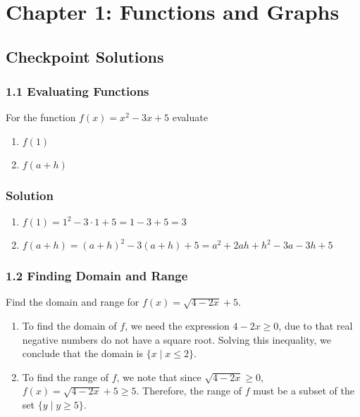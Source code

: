 \documentclass{article}
\begin{document}
\section*{Chapter 1: Functions and Graphs}

\subsection*{Checkpoint Solutions}

\subsubsection*{1.1 Evaluating Functions}

For the function $ f(x) = x^2 - 3x + 5 $ evaluate

\begin{enumerate}[label=(\alph*)]
  \item $ f(1) $
  \item $ f(a + h) $
\end{enumerate}

\subsubsection*{Solution}

\begin{enumerate}[label=(\alph*)]
  \item $ f(1) = 1 ^ 2 - 3 \cdot 1 + 5 = 1 - 3 + 5 = 3 $
  \item $ f(a + h) = (a + h)^2 - 3(a + h) + 5 = a^2 + 2ah + h^2 - 3a - 3h + 5 $
\end{enumerate}

\subsubsection*{1.2 Finding Domain and Range}

Find the domain and range for $ f(x) = \sqrt{4 - 2x} + 5 $.

\begin{enumerate}[label=\roman*]
  \item To find the domain of $ f $, we need the expression $ 4 - 2x \ge 0 $, due to that real negative numbers do not have a square root. Solving this inequality, we conclude that the domain is $ \{x \mid x \le 2\} $.
  \item To find the range of $ f $, we note that since $ \sqrt{4 - 2x} \ge 0 $, $ f(x) = \sqrt{4 - 2x} + 5 \ge 5 $. Therefore, the range of $ f $ must be a subset of the set $ \{ y \mid y \ge 5\} $.
\end{enumerate}
\end{document}
